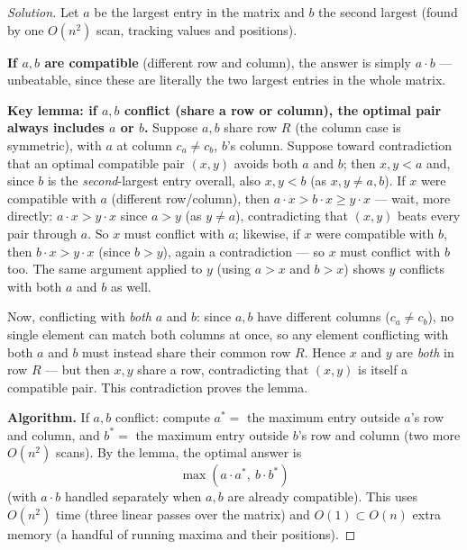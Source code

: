 \documentclass[11pt]{article}
\theoremstyle{definition}
\begin{document}
\begin{proof}[Solution]
Let $a$ be the largest entry in the matrix and $b$ the second largest (found by one $O(n^2)$ scan, tracking values and positions).

\textbf{If $a,b$ are compatible} (different row and column), the answer is simply $a\cdot b$ — unbeatable, since these are literally the two largest entries in the whole matrix.

\textbf{Key lemma: if $a,b$ conflict (share a row or column), the optimal pair always includes $a$ or $b$.} Suppose $a,b$ share row $R$ (the column case is symmetric), with $a$ at column $c_a\ne c_b$, $b$'s column. Suppose toward contradiction that an optimal compatible pair $(x,y)$ avoids both $a$ and $b$; then $x,y<a$ and, since $b$ is the \emph{second}-largest entry overall, also $x,y<b$ (as $x,y\ne a,b$). If $x$ were compatible with $a$ (different row/column), then $a\cdot x>b\cdot x\ge y\cdot x$ — wait, more directly: $a\cdot x>y\cdot x$ since $a>y$ (as $y\ne a$), contradicting that $(x,y)$ beats every pair through $a$. So $x$ must conflict with $a$; likewise, if $x$ were compatible with $b$, then $b\cdot x>y\cdot x$ (since $b>y$), again a contradiction — so $x$ must conflict with $b$ too. The same argument applied to $y$ (using $a>x$ and $b>x$) shows $y$ conflicts with both $a$ and $b$ as well.

Now, conflicting with \emph{both} $a$ and $b$: since $a,b$ have different columns ($c_a\ne c_b$), no single element can match both columns at once, so any element conflicting with both $a$ and $b$ must instead share their common row $R$. Hence $x$ and $y$ are \emph{both} in row $R$ — but then $x,y$ share a row, contradicting that $(x,y)$ is itself a compatible pair. This contradiction proves the lemma.

\textbf{Algorithm.} If $a,b$ conflict: compute $a^*=$ the maximum entry outside $a$'s row and column, and $b^*=$ the maximum entry outside $b$'s row and column (two more $O(n^2)$ scans). By the lemma, the optimal answer is
\[
\boxed{\max(a\cdot a^*,\ b\cdot b^*)}
\]
(with $a\cdot b$ handled separately when $a,b$ are already compatible). This uses $O(n^2)$ time (three linear passes over the matrix) and $O(1)\subset O(n)$ extra memory (a handful of running maxima and their positions).
\end{proof}
\end{document}
